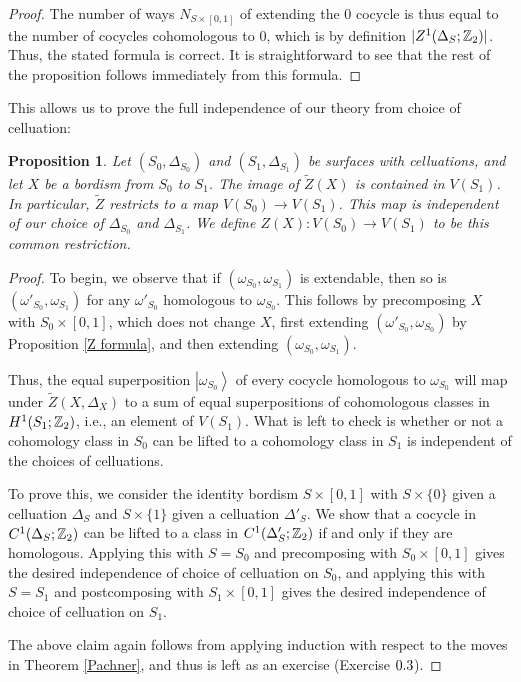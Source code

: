 \documentclass{article}
\newtheorem{proposition}{Proposition}[section]
\theoremstyle{definition}
\numberwithin{figure}{section}
\begin{document}
\begin{proof}
The number of ways $N_{S\times [0,1]}$ of extending the $0$ cocycle is thus equal to the number of cocycles cohomologous to $0$, which is by definition $|Z^1(\Delta_S;\mathbb{Z}_2)|$. Thus, the stated formula is correct. It is straightforward to see that the rest of the proposition follows immediately from this formula.
\end{proof}

This allows us to prove the full independence of our theory from choice of celluation:

\begin{proposition}\label{S0S1 independence} Let $(S_0,\Delta_{S_0})$ and $\left(S_1,\Delta_{S_1}\right)$ be surfaces with celluations, and let $X$ be a bordism from $S_0$ to $S_1$. The image of $\tilde{Z}(X)$ is contained in $V(S_1)$. In particular, $\tilde{Z}$ restricts to a map $V(S_0)\xrightarrow{}V(S_1)$. This map is independent of our choice of $\Delta_{S_0}$ and $\Delta_{S_1}$. We define $Z(X): V(S_0)\xrightarrow{}V(S_1)$ to be this common restriction.
\end{proposition}
\begin{proof} To begin, we observe that if $(\omega_{S_0},\omega_{S_1})$ is extendable, then so is $(\omega'_{S_0},\omega_{S_1})$ for any $\omega'_{S_0}$ homologous to $\omega_{S_0}$. This follows by precomposing $X$ with $S_0\times [0,1]$, which does not change $X$, first extending $(\omega'_{S_0},\omega_{S_0})$ by Proposition \ref{Z formula}, and then extending $(\omega_{S_0},\omega_{S_1})$.

Thus, the equal superposition $\left|\omega_{S_0}\right>$ of every cocycle homologous to $\omega_{S_0}$ will map  under $\tilde{Z}(X,\Delta_X)$ to a sum of equal superpositions of cohomologous classes in $H^1(S_1;\mathbb{Z}_2)$, i.e., an element of $V(S_1)$. What is left to check is whether or not a cohomology class in $S_0$ can be lifted to a cohomology class in $S_1$ is independent of the choices of celluations.

To prove this, we consider the identity bordism $S\times [0,1]$ with $S\times \{0\}$ given a celluation $\Delta_{S}$ and $S\times \{1\}$ given a celluation $\Delta'_S$. We show that a cocycle in $C^1(\Delta_{S};\mathbb{Z}_2)$ can be lifted to a class in $C^1(\Delta'_{S};\mathbb{Z}_2)$ if and only if they are homologous. Applying this with $S=S_0$ and precomposing with $S_0\times [0,1]$ gives the desired independence of choice of celluation on $S_0$, and applying this with $S=S_1$ and postcomposing with $S_1\times [0,1]$ gives the desired independence of choice of celluation on $S_1$.

The above claim again follows from applying induction with respect to the moves in Theorem \ref{Pachner}, and thus is left as an exercise (Exercise $\thesection.3$).
\end{proof}
\end{document}
